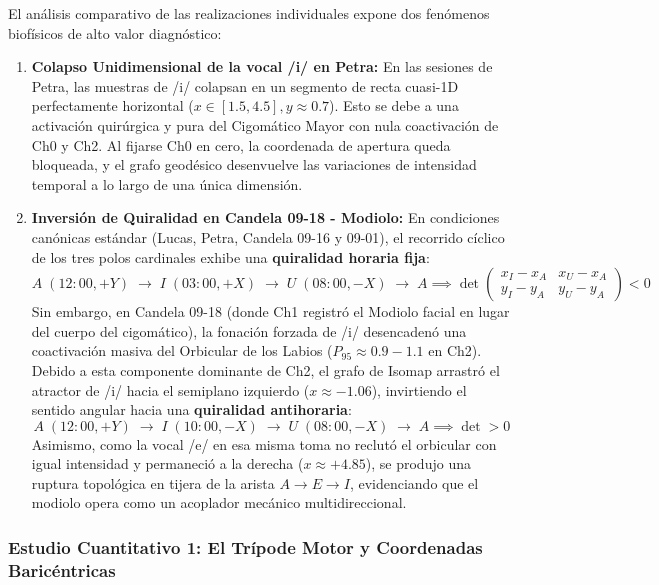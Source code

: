 \documentclass[11pt,a4paper,openany]{book}
\theoremstyle{definition}
\begin{document}
El análisis comparativo de las realizaciones individuales expone dos fenómenos biofísicos de alto valor diagnóstico:
\begin{enumerate}
    \item \textbf{Colapso Unidimensional de la vocal /i/ en Petra:} En las sesiones de Petra, las muestras de /i/ colapsan en un segmento de recta cuasi-1D perfectamente horizontal ($x \in [1.5, 4.5], y \approx 0.7$). Esto se debe a una activación quirúrgica y pura del Cigomático Mayor con nula coactivación de Ch0 y Ch2. Al fijarse Ch0 en cero, la coordenada de apertura queda bloqueada, y el grafo geodésico desenvuelve las variaciones de intensidad temporal a lo largo de una única dimensión.
    \item \textbf{Inversión de Quiralidad en Candela 09-18 - Modiolo:} En condiciones canónicas estándar (Lucas, Petra, Candela 09-16 y 09-01), el recorrido cíclico de los tres polos cardinales exhibe una \textbf{quiralidad horaria fija}:
    \begin{equation}
        A \; (12:00, +Y) \;\longrightarrow\; I \; (03:00, +X) \;\longrightarrow\; U \; (08:00, -X) \;\longrightarrow\; A \implies \det \begin{pmatrix} x_I - x_A & x_U - x_A \\ y_I - y_A & y_U - y_A \end{pmatrix} < 0
    \end{equation}
    Sin embargo, en Candela 09-18 (donde Ch1 registró el Modiolo facial en lugar del cuerpo del cigomático), la fonación forzada de /i/ desencadenó una coactivación masiva del Orbicular de los Labios ($P_{95} \approx 0.9 - 1.1$ en Ch2). Debido a esta componente dominante de Ch2, el grafo de Isomap arrastró el atractor de /i/ hacia el semiplano izquierdo ($x \approx -1.06$), invirtiendo el sentido angular hacia una \textbf{quiralidad antihoraria}:
    \begin{equation}
        A \; (12:00, +Y) \;\longrightarrow\; I \; (10:00, -X) \;\longrightarrow\; U \; (08:00, -X) \;\longrightarrow\; A \implies \det > 0
    \end{equation}
    Asimismo, como la vocal /e/ en esa misma toma no reclutó el orbicular con igual intensidad y permaneció a la derecha ($x \approx +4.85$), se produjo una ruptura topológica en tijera de la arista $A \to E \to I$, evidenciando que el modiolo opera como un acoplador mecánico multidireccional.
\end{enumerate}

\subsubsection{Estudio Cuantitativo 1: El Trípode Motor y Coordenadas Baricéntricas}
\label{subsubsec:estudio_tripode_motor}
\end{document}
